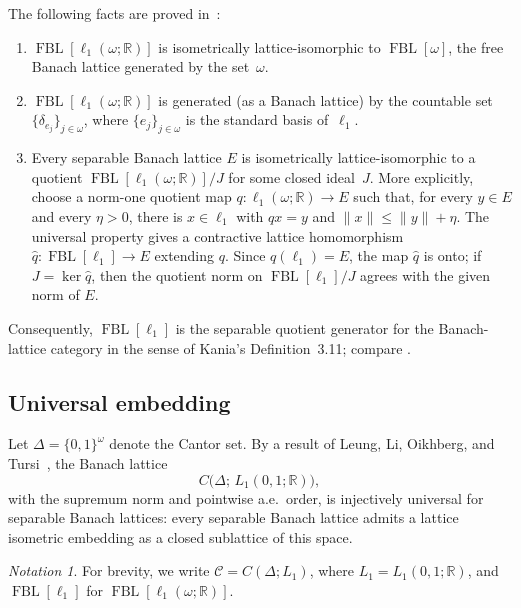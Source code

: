 \documentclass[12pt]{amsart}
\renewcommand{\le}{\leqslant}
\theoremstyle{plain}
\theoremstyle{definition}
\theoremstyle{remark}
\newtheorem{notation}[theorem]{Notation}
\DeclareMathOperator{\FBL}{FBL}
\newcommand{\R}{\mathbb{R}}
\begin{document}
The following facts are proved in~\cite{aviles2018free}:
\begin{enumerate}[label=(\alph*)]
    \item $\FBL[\ell_1(\omega; \R)]$ is isometrically lattice-isomorphic to
      $\FBL[\omega]$, the free Banach lattice generated by the set~$\omega$.
    \item $\FBL[\ell_1(\omega; \R)]$ is generated (as a Banach lattice) by the
      countable set
      $\{\delta_{e_j}\}_{j \in \omega}$, where $\{e_j\}_{j \in \omega}$ is the
      standard basis of~$\ell_1$.
    \item Every separable Banach lattice $E$ is isometrically lattice-isomorphic
      to a quotient $\FBL[\ell_1(\omega; \R)]/J$ for some closed ideal~$J$.
      More explicitly, choose a norm-one quotient map
      $q\colon \ell_1(\omega;\R)\to E$ such that, for every $y\in E$ and
      every $\eta>0$, there is $x\in\ell_1$ with $q x=y$ and
      $\|x\|\le \|y\|+\eta$.  The universal property gives a contractive
      lattice homomorphism $\widehat q\colon \FBL[\ell_1]\to E$ extending
      $q$.  Since $q(\ell_1)=E$, the map $\widehat q$ is onto; if
      $J=\ker \widehat q$, then the quotient norm on
      $\FBL[\ell_1]/J$ agrees with the given norm of $E$.
\end{enumerate}
Consequently, \(\FBL[\ell_1]\) is the separable quotient generator for the
Banach-lattice category in the sense of Kania's Definition~3.11; compare
\cite[Remark~5.1(c)]{Kan2026Pol}.

\subsection{Universal embedding}

Let $\Delta = \{0,1\}^\omega$ denote the Cantor set.
By a result of Leung, Li, Oikhberg, and Tursi~\cite{LLOT2019Uni}, the Banach
lattice
\[
    C\bigl(\Delta;\, L_1(0,1; \R)\bigr),
\]
with the supremum norm and pointwise a.e.\ order, is injectively universal for
separable Banach lattices: every separable Banach lattice admits a lattice
isometric embedding as a closed sublattice of this space.

\begin{notation}
For brevity, we write $\mathcal{C} = C(\Delta; L_1)$, where
$L_1 = L_1(0,1; \R)$, and $\FBL[\ell_1]$ for $\FBL[\ell_1(\omega; \R)]$.
\end{notation}

\end{document}

